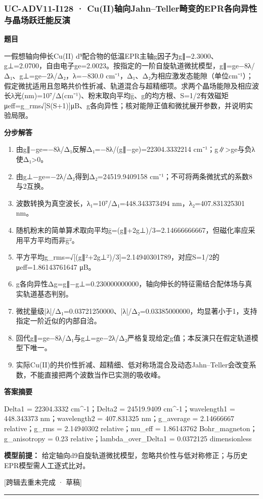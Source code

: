 \documentclass[UTF8,11pt,a4paper]{ctexart}
\begin{document}
\subsubsection*{UC-ADV11-I128 · Cu(II)轴向Jahn–Teller畸变的EPR各向异性与晶场跃迁能反演}
\noindent\textbf{题目}\par
一假想轴向伸长Cu(II) d⁹配合物的低温EPR主轴g因子为g∥=2.3000、g⊥=2.0700，自由电子ge=2.0023。按指定的一阶自旋轨道微扰模型，g∥=ge−8λ/Δ₁、g⊥=ge−2λ/Δ₂，λ=−830.0 cm⁻¹，Δ₁、Δ₂为相应激发态能隙（单位cm⁻¹）；假定微扰适用且忽略共价性折减、轨道混合与超精细项。求两个晶场能隙及相应波长λ光(nm)=10⁷/Δ(cm⁻¹)、粉末取向平均ḡ、g的均方根、S=1/2有效磁矩μeff=g\_rms√[S(S+1)]μB、g各向异性；核对能隙正值和微扰展开参数，并说明实验局限。\par
\medskip\noindent\textbf{分步解答}
\begin{enumerate}
\item 由g∥−ge=−8λ/Δ₁反解Δ₁=−8λ/(g∥−ge)=22304.3332214 cm⁻¹；g∥>ge与负λ使Δ₁>0。
\item 由g⊥−ge=−2λ/Δ₂得到Δ₂=24519.9409158 cm⁻¹；不可将两条微扰式的系数8与2互换。
\item 波数转换为真空波长，λ₁=10⁷/Δ₁=448.343373494 nm，λ₂=407.831325301 nm。
\item 随机粉末的简单算术取向平均ḡ=(g∥+2g⊥)/3=2.14666666667，但磁化率应采用平方平均而非ḡ²。
\item 平方平均g\_rms=√[(g∥²+2g⊥²)/3]=2.14940301789，对应S=1/2的μeff=1.86143761647 μB。
\item g各向异性Δg=g∥−g⊥=0.230000000000，轴向伸长的特征需结合配体场与真实轨道基态判别。
\item 微扰量级|λ|/Δ₁=0.03721250000、|λ|/Δ₂=0.03385000000，均显著小于1，支持指定一阶近似的内部自洽。
\item 回代g∥=ge−8λ/Δ₁与g⊥=ge−2λ/Δ₂严格复现给定g值；本反演只在假定轨道模型下唯一。
\item 实际Cu(II)的共价性折减、超精细、低对称场混合及动态Jahn–Teller会改变系数，不能直接把两个波数当作已实测的吸收峰。
\end{enumerate}
\noindent\textbf{答案摘要}\par
Delta1 = 22304.3332 cm\textasciicircum{}-1；Delta2 = 24519.9409 cm\textasciicircum{}-1；wavelength1 = 448.343373 nm；wavelength2 = 407.831325 nm；g\_average = 2.14666667 relative；g\_rms = 2.14940302 relative；mu\_eff = 1.86143762 Bohr\_magneton；g\_anisotropy = 0.23 relative；lambda\_over\_Delta1 = 0.0372125 dimensionless\par
\noindent\textbf{模型前提：}
给定轴向d9自旋轨道微扰模型，忽略共价性与低对称修正；与历史EPR模型需人工逐式比对。\par
\noindent\textcolor{red!65!black}{[跨辑去重未完成 · 草稿]} \par
\medskip\hrule\medskip
{}
\end{document}
